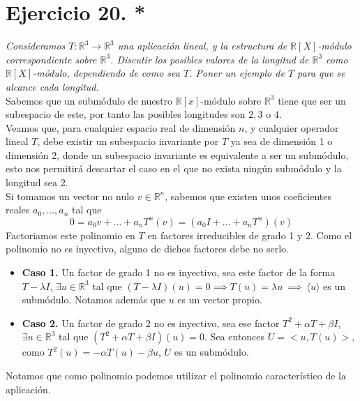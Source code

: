 \section{Ejercicio 20. *} \textit{Consideramos \(T:\mathbb{R}^3 \to
  \mathbb{R}^3\) una aplicación lineal, y la estructura de
  \(\mathbb{R}[X]\)-módulo correspondiente sobre \(\mathbb{R}^3\). Discutir los
  posibles valores de la longitud de \(\mathbb{R}^3\) como
  \(\mathbb{R}[X]\)-módulo, dependiendo de como sea \(T\). Poner un ejemplo de
  \(T\) para que se alcance cada longitud.}\\

Sabemos que un submódulo de nuestro \(\mathbb{R}[x]\)-módulo sobre
\(\mathbb{R}^3\) tiene  que ser un subespacio de este, por tanto las posibles
longitudes son \(2,3\) o \(4\).\\

Veamos que, para cualquier espacio real de dimensión \(n\), y cualquier operador
lineal \(T\), debe existir un subespacio invariante por \(T\) ya sea de
dimensión 1 o dimensión 2, donde un subespacio invariante es equivalente a ser
un submódulo, esto nos permitirá descartar el caso en el que no exista ningún
submódulo y la longitud sea 2.\\

Si tomamos un vector no nulo \(v \in \mathbb{R}^n\), sabemos que existen unos
coeficientes reales \(a_0, \dots, a_n\) tal que
\[
  0 = a_0v + \dots + a_nT^n(v) = (a_0I + \dots + a_nT^n)(v)
\]
Factoriamos este polinomio en \(T\) en factores irreducibles de grado 1 y 2.
Como el polinomio no es inyectivo, alguno de dichos factores debe no serlo.
\begin{itemize}
\item \textbf{Caso 1.} Un factor de grado 1 no es inyectivo, sea este factor de la
  forma \(T - \lambda I\), \(\exists u \in \mathbb{R}^3\) tal que \((T - \lambda
  I)(u) = 0 \implies T(u) = \lambda u \ \implies \ \langle u \rangle\) es un submódulo. Notamos además que \(u\) es un vector propio.
\item \textbf{Caso 2.} Un factor de grado 2 no es inyectivo, sea ese factor
  \(T^2 + \alpha T + \beta I\), \(\exists u \in \mathbb{R}^3\) tal que \((T^2 +
  \alpha T + \beta I)(u)= 0\). Sea entonces \(U = <u,T(u)>\), como \(T^2(u) =
  -\alpha T(u) - \beta u \), \(U\) es un submódulo.
\end{itemize}
Notamos que como polinomio podemos utilizar el polinomio característico de la
aplicación.\\

